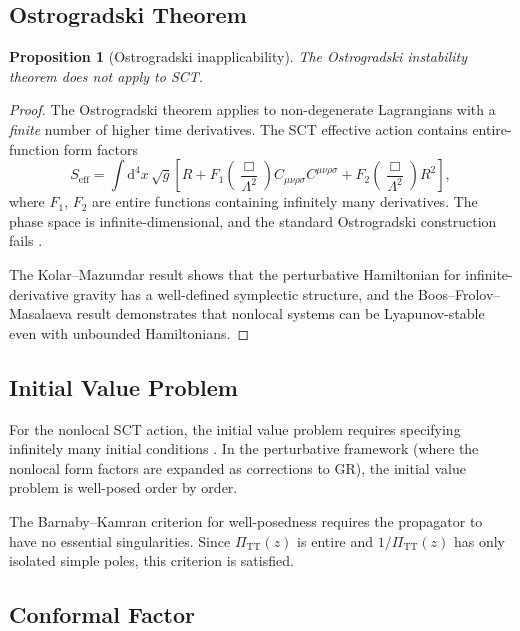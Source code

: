 \documentclass[11pt,a4paper]{article}
\newcommand{\dd}{\mathrm{d}}
\newcommand{\Weylsq}{C_{\mu\nu\rho\sigma}C^{\mu\nu\rho\sigma}}
\newcommand{\Rsq}{R^2}
\newcommand{\PiTT}{\Pi_{\mathrm{TT}}}
\newtheorem{proposition}[theorem]{Proposition}
\begin{document}
\subsection{Ostrogradski Theorem}

\begin{proposition}[Ostrogradski inapplicability]
\label{prop:ostrogradski}
The Ostrogradski instability theorem does not apply to SCT.
\end{proposition}

\begin{proof}
The Ostrogradski theorem applies to non-degenerate Lagrangians with a
\emph{finite} number of higher time derivatives.  The SCT effective
action contains entire-function form factors
\begin{equation}
  S_{\mathrm{eff}}
  = \int \dd^4x\,\sqrt{g}\left[
    R
    + F_1\!\left(\frac{\Box}{\Lambda^2}\right)\Weylsq
    + F_2\!\left(\frac{\Box}{\Lambda^2}\right)\Rsq
  \right],
\end{equation}
where $F_1$, $F_2$ are entire functions containing infinitely many
derivatives.  The phase space is infinite-dimensional, and the standard
Ostrogradski construction fails \cite{BarnabyKamran2007}.

The Kolar--Mazumdar result \cite{KolarMazumdar2020} shows that the
perturbative Hamiltonian for infinite-derivative gravity has a
well-defined symplectic structure, and the Boos--Frolov--Masalaeva
result \cite{BoosFrolov2024} demonstrates that nonlocal systems can
be Lyapunov-stable even with unbounded Hamiltonians.
\end{proof}

\subsection{Initial Value Problem}

For the nonlocal SCT action, the initial value problem requires
specifying infinitely many initial conditions \cite{BarnabyKamran2007}.
In the perturbative framework (where the nonlocal form factors are
expanded as corrections to GR), the initial value problem is well-posed
order by order.

The Barnaby--Kamran criterion for well-posedness requires the propagator
to have no essential singularities.  Since $\PiTT(z)$ is entire and
$1/\PiTT(z)$ has only isolated simple poles, this criterion is
satisfied.

\subsection{Conformal Factor}
\label{sec:conformal}
\end{document}

